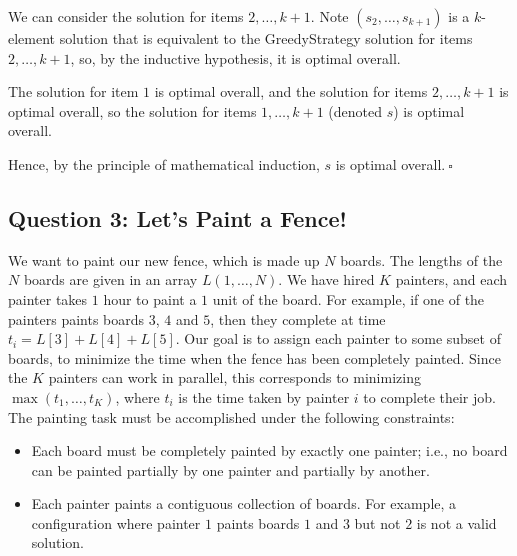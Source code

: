 \begin{enumerate}
\begin{solution}
We can consider the solution for items $2,\dots,k+1$. Note $(s_2,\dots,s_{k+1})$ is a $k$-element solution that is equivalent to the {\sc GreedyStrategy} solution for items $2,\dots,k+1$, so, by the inductive hypothesis, it is optimal overall. 

The solution for item $1$ is optimal overall, and the solution for items $2,\dots,k+1$ is optimal overall, so the solution for items $1,\dots,k+1$ (denoted $s$) is optimal overall.

Hence, by the principle of mathematical induction, $s$ is optimal overall.$~\square$
\end{solution}
\end{enumerate}
\subsection*{Question 3: Let's Paint a Fence!}

We want to paint our new fence, which is made up $N$ boards. The
lengths of the $N$ boards are given in an array
$L(1,\ldots,N)$. We have hired $K$ painters, and
each painter takes $1$ hour to paint a $1$ unit of the board. For example,
if one of the painters paints boards $3$, $4$ and $5$, then they
complete at time $t_i=L[3]+L[4]+L[5]$. Our goal is to assign each
painter to some subset of boards, to minimize the time when the fence
has been completely painted. Since the $K$ painters can work in
parallel, this corresponds to minimizing $\max(t_1,\ldots,t_K)$, where
$t_i$ is the time taken by painter $i$ to complete their job. The
painting task must be accomplished under the following constraints:
\begin{itemize}
    \item Each board must be completely painted by exactly one painter;
      i.e., no board can be painted partially by one painter and partially
      by another.
    \item Each painter paints a contiguous collection of boards.  For example, a
      configuration where painter $1$ paints boards $1$ and $3$ but not
      $2$ is not a valid solution.
\end{itemize}

